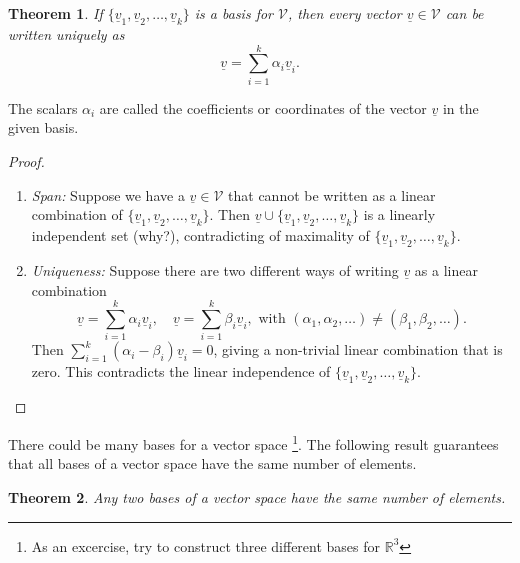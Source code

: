 \documentclass{tufte-handout}
\newtheorem{theorem}{Theorem}
\theoremstyle{remark}
\renewcommand{\vec}[1]{\underline{#1}}
\begin{document}
\begin{theorem}
If $\{\vec{v}_1, \vec{v}_2, \ldots, \vec{v}_k\}$ is a basis for $\mathcal{V}$, then every vector $\vec{v} \in \mathcal{V}$ can be written uniquely as 
\[
\vec{v} = \sum_{i=1}^k \alpha_i \vec{v}_i.
\]
\end{theorem}
The scalars $\alpha_i$ are called the coefficients or coordinates of the vector $\vec{v}$ in the given basis.
\begin{proof}

\begin{enumerate}
    \item \emph{Span:} Suppose we have a $\vec{v} \in \mathcal{V}$ that cannot be written as a linear combination of $\{\vec{v}_1, \vec{v}_2, \ldots, \vec{v}_k\}$. Then $\vec{v} \cup \{\vec{v}_1, \vec{v}_2, \ldots, \vec{v}_k\}$ is a linearly independent set (why?), contradicting of maximality of $\{\vec{v}_1, \vec{v}_2, \ldots, \vec{v}_k\}$.
    \item \emph{Uniqueness:} Suppose there are two different ways of writing $\vec{v}$ as a linear combination
    \[
    \vec{v} = \sum_{i=1}^k \alpha_i \vec{v}_i , \quad \vec{v} = \sum_{i=1}^k \beta_i \vec{v}_i, \text{ with } (\alpha_1, \alpha_2, \ldots) \neq (\beta_1, \beta_2, \ldots). 
    \]
    Then  $\sum_{i=1}^k (\alpha_i - \beta_i) \vec{v}_i = 0$, giving a non-trivial linear combination that is zero. This contradicts the linear independence of $\{\vec{v}_1, \vec{v}_2, \ldots, \vec{v}_k\}$.
\end{enumerate}
\end{proof}

There could be many bases for a vector space \footnote{As an excercise, try to construct three different bases for $\mathbb{R}^3$}. The following result guarantees that all bases of a vector space have the same number of elements.

\begin{theorem}
\label{thm:dim}
 Any two bases of a vector space have the same number of elements.
\end{theorem}
\end{document}

